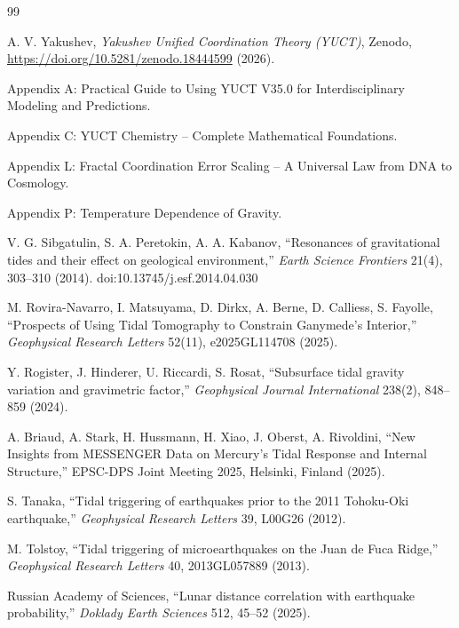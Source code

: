 \documentclass[12pt,a4paper]{article}
\theoremstyle{remark}
\begin{document}
	\begin{thebibliography}{99}
		
		A. V. Yakushev, \emph{Yakushev Unified Coordination Theory (YUCT)}, Zenodo, \url{https://doi.org/10.5281/zenodo.18444599} (2026).
		
		Appendix A: Practical Guide to Using YUCT V35.0 for Interdisciplinary Modeling and Predictions.
		
		Appendix C: YUCT Chemistry -- Complete Mathematical Foundations.
		
		Appendix L: Fractal Coordination Error Scaling -- A Universal Law from DNA to Cosmology.
		
		Appendix P: Temperature Dependence of Gravity.
		
		V. G. Sibgatulin, S. A. Peretokin, A. A. Kabanov, ``Resonances of gravitational tides and their effect on geological environment,'' \emph{Earth Science Frontiers} 21(4), 303–310 (2014). doi:10.13745/j.esf.2014.04.030
		
		M. Rovira-Navarro, I. Matsuyama, D. Dirkx, A. Berne, D. Calliess, S. Fayolle, ``Prospects of Using Tidal Tomography to Constrain Ganymede's Interior,'' \emph{Geophysical Research Letters} 52(11), e2025GL114708 (2025).
		
		Y. Rogister, J. Hinderer, U. Riccardi, S. Rosat, ``Subsurface tidal gravity variation and gravimetric factor,'' \emph{Geophysical Journal International} 238(2), 848–859 (2024).
		
		A. Briaud, A. Stark, H. Hussmann, H. Xiao, J. Oberst, A. Rivoldini, ``New Insights from MESSENGER Data on Mercury's Tidal Response and Internal Structure,'' EPSC-DPS Joint Meeting 2025, Helsinki, Finland (2025).
		
		S. Tanaka, ``Tidal triggering of earthquakes prior to the 2011 Tohoku-Oki earthquake,'' \emph{Geophysical Research Letters} 39, L00G26 (2012).
		
		M. Tolstoy, ``Tidal triggering of microearthquakes on the Juan de Fuca Ridge,'' \emph{Geophysical Research Letters} 40, 2013GL057889 (2013).
		
		Russian Academy of Sciences, ``Lunar distance correlation with earthquake probability,'' \emph{Doklady Earth Sciences} 512, 45–52 (2025).
		

\end{thebibliography}
\end{document}
